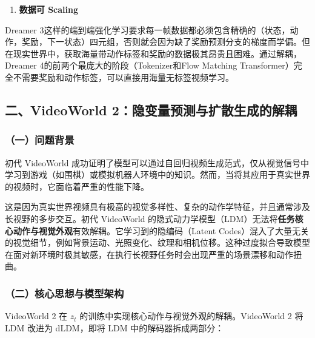 \begin{enumerate}
\def\labelenumi{\arabic{enumi}.}
\setcounter{enumi}{1}
\tightlist
\item
  \textbf{数据可 Scaling}
\end{enumerate}

Dreamer 3这样的端到端强化学习要求每一帧数据都必须包含精确的（状态，动作，奖励，下一状态）四元组，否则就会因为缺了奖励预测分支的梯度而学偏。但在现实世界中，获取海量带动作标签和奖励的数据极其昂贵且困难。通过解耦，Dreamer 4的前两个最庞大的阶段（Tokenizer和Flow Matching Transformer）完全不需要奖励和动作标签，可以直接用海量无标签视频学习。

\hypertarget{ux4e8cvideoworld-2ux9690ux53d8ux91cfux9884ux6d4bux4e0eux6269ux6563ux751fux6210ux7684ux89e3ux8026}{%
\subsection{二、VideoWorld 2：隐变量预测与扩散生成的解耦}\label{ux4e8cvideoworld-2ux9690ux53d8ux91cfux9884ux6d4bux4e0eux6269ux6563ux751fux6210ux7684ux89e3ux8026}}

\hypertarget{ux4e00ux95eeux9898ux80ccux666f-12}{%
\subsubsection{（一）问题背景}\label{ux4e00ux95eeux9898ux80ccux666f-12}}

初代 VideoWorld 成功证明了模型可以通过自回归视频生成范式，仅从视觉信号中学习到游戏（如围棋）或模拟机器人环境中的知识。然而，当将其应用于真实世界的视频时，它面临着严重的性能下降。

这是因为真实世界视频具有极高的视觉多样性、复杂的动作学特征，并且通常涉及长视野的多步交互。初代 VideoWorld 的隐式动力学模型（LDM）无法将\textbf{任务核心动作与视觉外观}有效解耦。它学习到的隐编码（Latent Codes）混入了大量无关的视觉细节，例如背景运动、光照变化、纹理和相机位移。这种过度拟合导致模型在面对新环境时极其敏感，在执行长视野任务时会出现严重的场景漂移和动作扭曲。

\hypertarget{ux4e8cux6838ux5fc3ux601dux60f3ux4e0eux6a21ux578bux67b6ux6784}{%
\subsubsection{（二）核心思想与模型架构}\label{ux4e8cux6838ux5fc3ux601dux60f3ux4e0eux6a21ux578bux67b6ux6784}}

VideoWorld 2 在 \(z_t\) 的训练中实现核心动作与视觉外观的解耦。VideoWorld 2 将 LDM 改进为 dLDM，即将 LDM 中的解码器拆成两部分：

